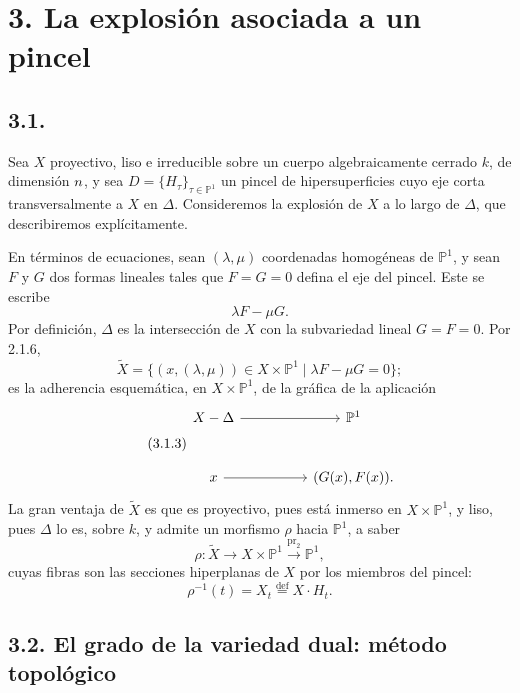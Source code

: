 \pageoriginale

\section*{3. La explosión asociada a un pincel}

\subsection*{3.1.}
Sea $X$ proyectivo, liso e irreducible sobre un cuerpo algebraicamente
cerrado $k$, de dimensión $\sisi{u}{n}$, y sea
$D=\{H_\tau\}_{\tau\in\mathbb P^1}$ un pincel de hipersuperficies cuyo
eje corta transversalmente a $X$ en $\Delta$. Consideremos la explosión
de $X$ a lo largo de $\Delta$, que describiremos explícitamente.

En términos de ecuaciones, sean $(\lambda,\mu)$ coordenadas homogéneas
de $\mathbb P^1$, y sean $F$ y $G$ dos formas lineales tales que
$F=G=0$ defina el eje del pincel. Este se escribe
\begin{equation}\tag{3.1.1}
\lambda F-\mu G.
\end{equation}
Por definición, $\Delta$ es la intersección de $X$ con la subvariedad
lineal $G=F=0$. Por 2.1.6,
\begin{equation}\tag{3.1.2}
\widetilde X
=\{(x,(\lambda,\mu))\in X\times\mathbb P^1
       \mid \lambda F-\mu G=0\};
\end{equation}
es la adherencia esquemática, en $X\times\mathbb P^1$, de la gráfica
de la aplicación
\begin{equation}\tag{3.1.3}
\begin{tikzcd}[row sep=large,column sep=huge]
X-\Delta \arrow[r] & \mathbb P^1 \\
x \arrow[r] & (G(x),F(x)).
\end{tikzcd}
\end{equation}
La gran ventaja de $\widetilde X$ es que es proyectivo, pues está
inmerso en $X\times\mathbb P^1$, y liso, pues $\Delta$ lo es, sobre
$k$, y admite un morfismo $\rho$ hacia $\mathbb P^1$, a saber
\begin{equation}\tag{3.1.4}
\rho:\widetilde X\longrightarrow X\times\mathbb P^1
\xrightarrow{\operatorname{pr}_2}\mathbb P^1,
\end{equation}
cuyas fibras son las secciones hiperplanas de $X$ por los miembros del
pincel:
\[
\rho^{-1}(t)=X_t\overset{\mathrm{def}}{=}X\cdot H_t.
\]

\pageoriginale

\subsection*{3.2. El grado de la variedad dual: método topológico}

